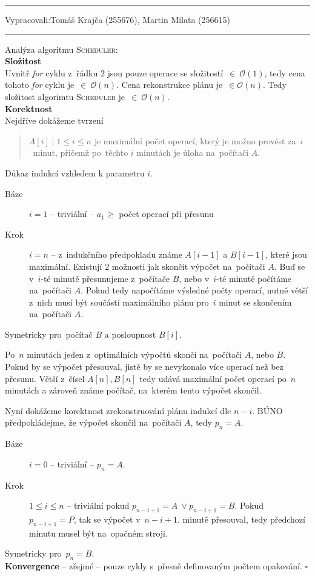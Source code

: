 \documentclass[12pt]{article}
\newcommand{\zadani}[2]{
{\large
\noindent {\bf IB108 \hfill{} Sada #1, Příklad #2 \\[-4mm]}
\noindent\hrule
\vspace{2mm}
\noindent Vypracovali:\hfill{}Tomáš Krajča (255676), Martin Milata (256615)
\vspace{3mm}
\hrule
\bigskip\bigskip}
}
\begin{document}
\clearpage
\zadani{2}{4}
\noindent
Analýza algoritmu \textsc{Scheduler}:\\
\textbf{Složitost}\\
Uvnitř \textit{for} cyklu z~řádku $2$ jsou pouze operace se složitostí~$\in~\mathcal{O}(1)$, tedy cena tohoto \textit{for} cyklu je~$\in~\mathcal{O}(n)$.
Cena rekonstrukce plánu je~$\in
\mathcal{O}(n)$. Tedy složitost algorimtu \textsc{Scheduler}
je~$\in~\mathcal{O}(n)$.\\
\textbf{Korektnost}\\
\renewcommand{\labelenumi}{\textbf{\alph{enumi})}}
Nejdříve dokážeme tvrzení
\begin{quotation}
$A[i] \mid 1\leq i \leq n$ je maximální počet operací, který je
možno provést za~$i$~minut, přičemž po~těchto $i$ minutách je úloha na~počítači
$A$.
\end{quotation}
Důkaz indukcí vzhledem k parametru $i$.
\begin{description}
\item [Báze]{$i=1$} -- triviální -- $a_1 \geq $ počet operací při přesunu
\item [Krok]{$i=n$} -- z~indukčního předpokladu známe $A[i-1]$ a $B[i-1]$, které
jsou maximální. Existují $2$
možnosti jak skončit výpočet na~počítači $A$. Buď se v~$i$-té minutě přesunujeme
z~počítače $B$, nebo v~$i$-té minutě počítáme na~počítači $A$. Pokud tedy napočítáme
výsledné počty operací, nutně větší z~nich musí být součástí maximálního plánu
pro~$i$ minut se skončením na~počítači $A$.
\end{description}
Symetricky pro~počítač $B$ a posloupnost $B[i]$.

\noindent
Po~$n$ minutách jeden z~optimálních výpočtů skončí na~počítači $A$, nebo $B$. Pokud by
se výpočet přesouval, jistě by se nevykonalo více operací než bez přesunu.
Větší z~čísel $A[n], B[n]$ tedy udává maximální počet operací po~$n$ minutách a
zároveň známe počítač, na~kterém tento výpočet skončil. 

\noindent
Nyní dokážeme korektnost zrekonstruování plánu indukcí dle $n-i$.
BÚNO předpokládejme, že výpočet skončil na~počítači $A$, tedy $p_n=A$.
\begin{description}
\item [Báze]{$i=0$} -- triviální -- $p_n=A$.
\item [Krok]{$1\leq i \leq n$} -- triviální pokud $p_{n-i+1} = A~\vee p_{n-i+1}
= B$. Pokud $p_{n-i+1} = P$, tak se výpočet v~$n-i+1.$ minutě přesouval, tedy
předchozí minutu musel být na~opačném stroji.
\end{description}
Symetricky pro~$p_n=B$.\\
\textbf{Konvergence} -- zřejmé -- pouze cykly s~přesně definovaným počtem opakování.
\hfill$\square$
\end{document}
